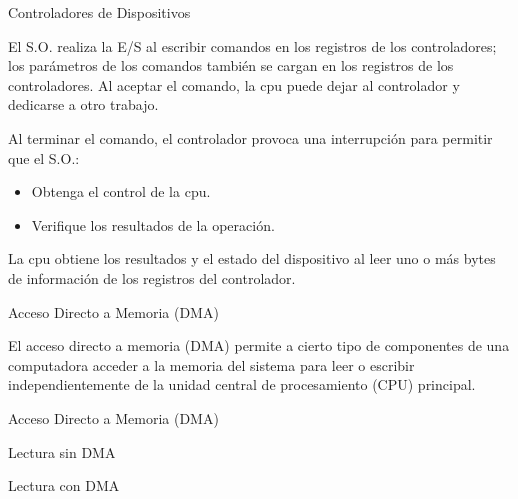 \documentclass{beamer}
\begin{document}
\begin{frame}{Controladores de Dispositivos}
  \begin{block}{}
  El S.O. realiza la E/S al escribir comandos en los registros de los controladores; los parámetros de los comandos también se cargan en los registros de los controladores. Al aceptar el comando, la cpu puede dejar al controlador y dedicarse a otro trabajo.
  \end{block}
  
  \begin{block}{Al terminar el comando, el controlador provoca una interrupción para permitir que el S.O.:}
  \begin{itemize}
    \item Obtenga el control de la cpu.
    \item Verifique los resultados de la operación.
\end{itemize}
  \end{block}
  \begin{block}{}
  La cpu obtiene los resultados y el estado del dispositivo
al leer uno o más bytes de información de los registros
del controlador.
  \end{block}
\end{frame}

\begin{frame}{Acceso Directo a Memoria (DMA)}
    \begin{block}{}
        El acceso directo a memoria (DMA) permite a cierto tipo de componentes de una computadora acceder a la memoria del sistema para leer o escribir independientemente de la unidad central de procesamiento (CPU) principal.
    \end{block}
\end{frame}

\begin{frame}{Acceso Directo a Memoria (DMA)}
    \begin{block}{}
        Lectura sin DMA
    \end{block}
    \begin{block}{}
        Lectura con DMA
    \end{block}
\end{frame}
\end{document}
